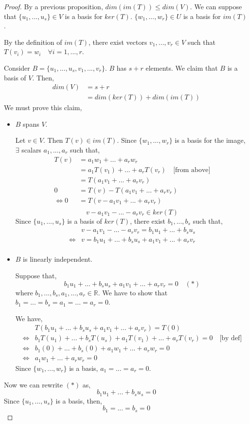 \documentclass{report}
\theoremstyle{definition}
\theoremstyle{remark}
\begin{document}
\begin{proof}

By a previous proposition, $dim(im(T))\leq dim(V)$.
We can suppose that $\{u_1,...,u_s\}\in V$ is a basis for $ker(T)$.
$\{w_1,...,w_r\}\in U$ is a basis for $im(T)$.

By the definition of $im(T)$, there exist vectors $v_1,...,v_r\in V$ such that $T(v_i)=w_i\quad\forall i=1,...,r$.

Consider $B=\{u_1,...,u_s,v_1,...,v_r\}$.
$B$ has $s+r$ elements.
We claim that $B$ is a basis of $V$.
Then,
\begin{align*}
 dim(V)&=s+r\\
 &=dim(ker(T))+dim(im(T))
\end{align*}
We must prove this claim,
\begin{itemize}
 \item $B$ spans $V$.
 
 Let $v\in V$.
 Then $T(v)\in im(T)$.
 Since $\{w_1,...,w_r\}$ is a basis for the image, $\exists$ scalars $a_1,...,a_r$ such that,
 \begin{align*}
  T(v)&=a_1w_1+...+a_rw_r\\
  &=a_1T(v_1)+...+a_rT(v_r)\quad\text{[from above]}\\
  &=T(a_1v_1+...+a_rv_r)\\
  0&=T(v)-T(a_1v_1+...+a_rv_r)\\
  \Leftrightarrow 0&=T(v-a_1v_1+...+a_rv_r)\\
 \end{align*}
 \[v-a_1v_1-...-a_rv_r\in ker(T)\]
 Since $\{u_1,...,u_s\}$ is a basis of $ker(T)$, there exist $b_1,...,b_s$ such that,
 \begin{align*}
 & v-a_1v_1-...-a_rv_r=b_1u_1+...+b_su_s \\
 \Leftrightarrow & v=b_1u_1+...+b_su_s+a_1v_1+...+a_rv_r \\
 \end{align*}
 \item $B$ is linearly independent.
 
 Suppose that,
 \[b_1u_1+...+b_su_s+a_1v_1+...+a_rv_r=0 \quad (*)\]
 where $b_1,...,b_s,a_1,...,a_r\in \mathbb{R}$.
 We have to show that $b_1=...=b_s=a_1=...=a_r=0$.
 
 We have,
 \begin{align*}
  & T(b_1u_1+...+b_su_s+a_1v_1+...+a_rv_r)=T(0) \\
  \Leftrightarrow & b_1T(u_1)+...+b_sT(u_s)+a_1T(v_1)+...+a_rT(v_r)=0 \quad \text{[by def]} \\
  \Leftrightarrow & b_1(0)+...+b_s(0)+a_1w_1+...+a_rw_r=0 \\
  \Leftrightarrow & a_1w_1+...+a_rw_r=0
 \end{align*}
 Since $\{w_1,...,w_r\}$ is a basis, $a_1=...=a_r=0$.
\end{itemize}
Now we can rewrite $(*)$ as,
\[b_1u_1+...+b_su_s=0\]
Since $\{u_1,...,u_s\}$ is a basis, then,
\[b_1=...=b_s=0\]
\end{proof}
\end{document}
